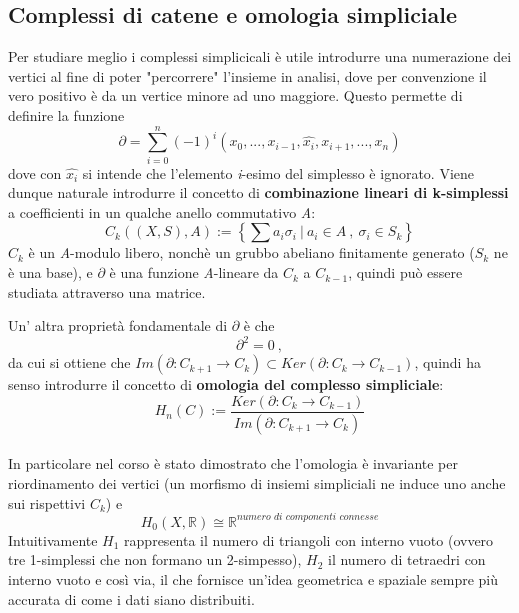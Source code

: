 \documentclass{article}
\begin{document}
	\subsection{Complessi di catene e omologia simpliciale}
	Per studiare meglio i complessi simplicicali è utile introdurre una numerazione dei vertici al fine di poter "percorrere" l'insieme in analisi, dove per convenzione il vero positivo è da un vertice minore ad uno maggiore. Questo permette di definire la funzione \[\partial= \sum_{i=0}^n (-1)^i (x_0,...,x_{i-1},\hat{x_i},x_{i+1},...,x_n)\] dove con \(\hat{x_i}\) si intende che l'elemento \textit{i}-esimo del simplesso è ignorato. Viene dunque naturale introdurre il concetto di \textbf{combinazione lineari di k-simplessi} a coefficienti in un qualche anello commutativo \textit{A}:
	\[C_k((X,S),A):= \left\{\sum a_i\sigma_i\ |\ a_i\in A\ ,\ \sigma_i\in S_k\right\}\]
	\(C_k\) è un \textit{A}-modulo libero, nonchè un grubbo abeliano finitamente generato (\(S_k\) ne è una base), e \(\partial\) è una funzione \textit{A}-lineare da \(C_k\) a \(C_{k-1}\), quindi può essere studiata attraverso una matrice. 
	\vspace{1cm}
	
	\vspace{1cm}
	Un' altra proprietà fondamentale di \(\partial\) è che \[\partial^2=0\ ,\] da cui si ottiene che \(Im(\partial:C_{k+1}\rightarrow C_k)\subset Ker(\partial:C_{k}\rightarrow C_{k-1})\), quindi ha senso introdurre il concetto di \textbf{omologia del complesso simpliciale}:\\\[H_n(C):=\frac{Ker(\partial:C_{k}\rightarrow C_{k-1})}{Im(\partial:C_{k+1}\rightarrow C_k)}\]\\
	In particolare nel corso è stato dimostrato che l'omologia è invariante per riordinamento dei vertici (un morfismo di insiemi simpliciali ne induce uno anche sui rispettivi \(C_k\)) e\\ \[H_0(X,\mathbb{R})\cong\mathbb{R}^{\textit{numero di componenti connesse}}\]
	Intuitivamente \(H_1\) rappresenta il numero di triangoli con interno vuoto (ovvero tre 1-simplessi che non formano un 2-simpesso), \(H_2\) il numero di tetraedri con interno vuoto e così via, il che fornisce un'idea geometrica e spaziale sempre più accurata di come i dati siano distribuiti.
	\vspace{1cm}
	
	\vspace{1cm}
	
	\vspace{1cm}
\end{document}
